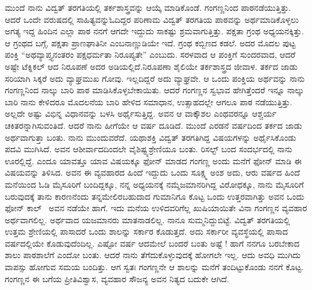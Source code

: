 {ಮುಂದೆ ನಾನು ವಿದ್ವತ್ ತರಗತಿಯಲ್ಲಿ ತರ್ಕಶಾಸ್ತ್ರವನ್ನು ಆಯ್ಕೆ ಮಾಡಿಕೊಂಡೆ. ಗಂಗಣ್ಣನಿಂದ  ಪಾಠನಡೆಯುತ್ತಿತ್ತು. ಆದರೆ ಒಂದೇ ವರುಷದಲ್ಲಿ ಸಾಹಿತ್ಯವನ್ನು\break ಓದಿದ್ದರ ಪರಿಣಾಮ ವಿದ್ವತ್ ತರಗತಿಯ ಪಾಠವನ್ನು ಅರ್ಥಮಾಡಿಕೊಳ್ಳಲು ಅಗತ್ಯ ಇದ್ದ ಹಿಂದಿನ ಎಲ್ಲಾ ಪಾಠ ನನಗೆ ಆಗದೇ ಇದ್ದುದು ಸಾಕಷ್ಟು  ಶ್ರಮವಾಗುತ್ತಿತ್ತು. \hbox{ಪಕ್ಷತಾ} ಗ್ರಂಥ ಅಧ್ಯಯನಕ್ಕಿತ್ತು. ಆ ಗ್ರಂಥದ ಬಗ್ಗೆ, ಪಕ್ಷತಾ ಪ್ರಾಣಘಾತಿನೀ ಎಂಬ\break ನಾಣ್ಣುಡಿಯೇ ಇದೆ. ಗ್ರಂಥ ಕಬ್ಬಿಣದ ಕಡಲೆ. ಅದರ ಮೊದಲ ಪುಟ್ಟ ಪಂಕ್ತಿ “ಅಥ\break ವ್ಯಾಪ್ತ್ಯನಂತರಂ ಪಕ್ಷ\-ಧರ್ಮತಾ ನಿರೂಪ್ಯತೇ” ಎಂಬುದು. ಸರಳವಾದ ಆ \hbox{ಪಂಕ್ತಿಗೆ} ಸುಂದರವಾದ, ಆದರೆ ಅಷ್ಟೇ ಟೆಕ್ನಿಕಲ್ ಆದ ನಿರೂಪಣೆ ಅದರ ಅಡಿಯಲ್ಲಿದೆ.\break ನಿರೂಪಣಾ ಶೈಲಿಯೇ ತರ್ಕ\-ಶಾಸ್ತ್ರದ ಜೀವಾಳ. ತರ್ಕದ ಜಾಡು ಸರಿಯಾಗಿ ಸಿಕ್ಕರೆ ಅದು ವ್ಯಾಘ್ರಮುಖ ಗೋವು. ಇಲ್ಲದಿದ್ದರೆ ಅದು ವ್ಯಾಘ್ರವೇ. ಆ ಒಂದು ಪಂಕ್ತಿಯ ಅರ್ಥವನ್ನು ನಾನು ಗಂಗಣ್ಣನಿಂದ ನಾಲ್ಕು ಬಾರಿ ಪಾಠ ಮಾಡಿಸಿಕೊಳ್ಳಬೇಕಾಯಿತು. ಆದರೆ ಗಂಗಣ್ಣನ ಸ್ವಭಾವ ಹೇಗಿತ್ತೆಂದರೆ ಇನ್ನೂ ನಾಲ್ಕು ಬಾರಿ ನಾನು ಕೇಳಿದರೂ ಮೊದಲನೆಯ ಬಾರಿ ಹೇಳಿದ ಸಮಾಧಾನ, ಉತ್ಸಾಹದಲ್ಲೇ ಆಗಲೂ ಪಾಠ ನಡೆಯುತ್ತಿತ್ತು. ಅಲ್ಲದೇ ಅಷ್ಟು ವಿಭಿನ್ನ ವಿಧಾನವನ್ನು ಬಳಸಿ ಅರ್ಥೈಸುತ್ತಿದ್ದ. ಅವನ ಆ ವಾಕ್ಕೌಶಲ \hbox{ಎಂಥವರನ್ನೂ} ಆಶ್ಚರ್ಯ ಚಕಿತರನ್ನಾಗಿಸುವಂತಿದೆ.  ಆದರೆ ನಾನು ಹೀಗೆಯೇ ಆ ವರ್ಷ ದೂಡಿದೆ. ಮುಂದೆ ಎರಡನೆ ವರ್ಷದಿಂದ ತರ್ಕದ ಜಾಡು ಅರ್ಥವಾಗುತ್ತಾ ಬಂತು. ನಾನು ಮುಂದುವರೆದೆ. ಯಥಾಶಕ್ತಿ ವಿದ್ವತ್ ತರಗತಿಗಿದ್ದ ವಿಷಯಗಳನ್ನು  ಅರ್ಥೈಸಿ\-ಕೊಂಡು ಪದವಿ ಮುಗಿಸಿದೆ. ಅವನ ಆಶೀರ್ವಾದದಿಂದಲೇ ವೈಶಿಷ್ಟ್ಯಶ್ರೇಣಿಯೂ ಬಂತು. \hbox{ರಿಸಲ್ಟ್}  ಬಂದ  ಸಂದರ್ಭದಲ್ಲಿ ನಾನು ಊರಲ್ಲಿದ್ದೆ. ಎಂದೂ ಯಾವತ್ತೂ ಯಾವ ವಿಷಯಕ್ಕೂ ಫೋನ್ ಮಾಡದ ಗಂಗಣ್ಣ ಅಂದು ಮನೆಗೆ ಫೋನ್ ಮಾಡಿ ಈ ವಿಷಯವನ್ನು ತಿಳಿಸಿದ. ಅವನ ಈ ವ್ಯವಹಾರದ ಹಿಂದೆ ಇದ್ದುದು ಒಂದು ಸೂಕ್ಷ್ಮ ಅಂಶ \enginline{-} ಅದು, ಆರು ವರ್ಷದ ಹಿಂದೆ ಮನೆಯಿಂದ ಓಡಿ ಮೈಸೂರಿಗೆ ಬಂದಿದ್ದಕ್ಕೂ,  ನನ್ನ ಅಧ್ಯಯನಕ್ಕೆ ನಮ್ಮೆಜಮಾನರಿಗಿದ್ದ ವಿರೋಧಕ್ಕೂ, ನಾನು ಮೈಸೂರಿಗೆ ಬರುವುದಕ್ಕೆ ತಾನು ಕಾರಣನೆಂದು ತನ್ನ\break ಮೇಲಿರಬಹುದಾದ ಗುಮಾನಿಗೂ ಕೊಟ್ಟ ಒಂದು ಉತ್ತರವಾಗಿತ್ತು \enginline{-} ಅವನ ಒಂದು \hbox{ಫೋನ್} ಕಾಲ್~\enginline{-} ಅವನ ನಡೆಯೇ ಹಾಗೆ. ಇದು ಮನೆಯ ಉಳಿದವರಿಗೆಲ್ಲ ಖುಷಿಯಾಯಿತೇ ವಿನಾ ಗಂಗಣ್ಣನ ವ್ಯವಹಾರ ಅರ್ಥವಾಗಲಿಲ್ಲ. ಅರ್ಥವಾದ \hbox{ಯಜಮಾನರು} ಮಾತನಾಡಲಿಲ್ಲ. ನಾನೂ ಸುಮ್ಮನಿದ್ದುಬಿಟ್ಟೆ. ವಿದ್ವತ್ ತರಗತಿಯಲ್ಲಿ ಉತ್ತಮ ಶ್ರೇಣಿಯಲ್ಲಿ ಪಾಸಾದರೆ ಒಂದು ಶಾಲನ್ನು ಸರ್ಕಾರ ಕೊಡುತ್ತದೆ. ಅದು ಸರ್ಕಾರೀ \hbox{ವ್ಯವಸ್ಥೆಯಲ್ಲಿ} ಪಾಸಾದ ವರ್ಷದಲ್ಲಿಯೇ ಕೊಡುವುದೆಂದಿಲ್ಲ. ಎಷ್ಟೋ ವರ್ಷ \hbox{ಆದಮೇಲೆ} ಬಂದರೆ ಬಂತು ಅಷ್ಟೆ ! ಹಾಗೆ ನನಗೂ ಬರಬೇಕಾದ ಶಾಲು ಪಾಠಶಾಲೆಗೆ ಎಂದೋ ಬಂತು. ಆದರೆ ನಾನು ತೆಗೆದುಕೊಳ್ಳುವುದಕ್ಕೆ ಹೋಗಲೇ ಇಲ್ಲ. ಆದು ಅವಧಿ ಮುಗಿದು ವಾಪಸ್ಸು ಹೋಗುವ ಸಮಯ ಬಂದಿತ್ತು. ಆಗ ಸ್ವತಃ  ಗಂಗಣ್ಣನೇ ಆ \hbox{ಶಾಲನ್ನು} ಮನೆಗೆ ತಂದಿಟ್ಟುಕೊಂಡು ನನಗೆ ಕೊಟ್ಟ. ಗಂಗಣ್ಣನ ಈ ಬಗೆಯ ಪ್ರೀತಿ\enginline{-}ವಿಶ್ವಾಸ,  ವ್ಯವಹಾರ ಸೌಜನ್ಯ ಅವನ ನಿತ್ಯದ ಬದುಕೇ ಆಗಿದೆ.

}
